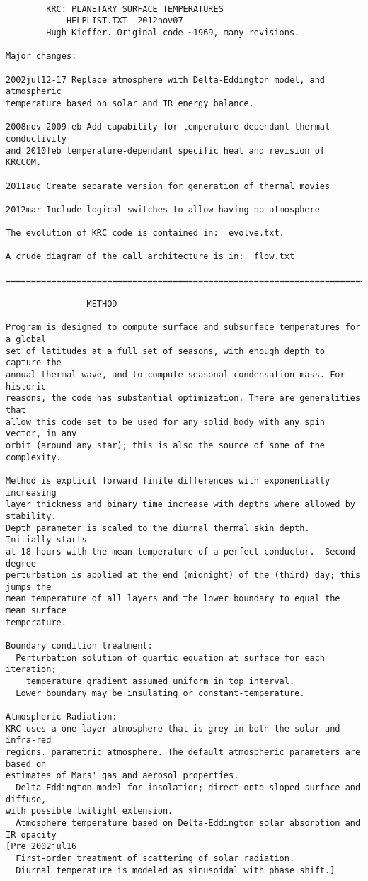 \begin{verbatim}

 		KRC: PLANETARY SURFACE TEMPERATURES
			HELPLIST.TXT  2012nov07
        Hugh Kieffer. Original code ~1969, many revisions.

Major changes:

2002jul12-17 Replace atmosphere with Delta-Eddington model, and atmospheric
temperature based on solar and IR energy balance. 

2008nov-2009feb Add capability for temperature-dependant thermal conductivity
and 2010feb temperature-dependant specific heat and revision of KRCCOM.

2011aug Create separate version for generation of thermal movies

2012mar Include logical switches to allow having no atmosphere

The evolution of KRC code is contained in:  evolve.txt.

A crude diagram of the call architecture is in:  flow.txt

================================================================================

				METHOD

Program is designed to compute surface and subsurface temperatures for a global
set of latitudes at a full set of seasons, with enough depth to capture the
annual thermal wave, and to compute seasonal condensation mass. For historic
reasons, the code has substantial optimization. There are generalities that
allow this code set to be used for any solid body with any spin vector, in any
orbit (around any star); this is also the source of some of the complexity.
 
Method is explicit forward finite differences with exponentially increasing
layer thickness and binary time increase with depths where allowed by stability.
Depth parameter is scaled to the diurnal thermal skin depth.  Initially starts
at 18 hours with the mean temperature of a perfect conductor.  Second degree
perturbation is applied at the end (midnight) of the (third) day; this jumps the
mean temperature of all layers and the lower boundary to equal the mean surface
temperature.

Boundary condition treatment:
  Perturbation solution of quartic equation at surface for each iteration;
    temperature gradient assumed uniform in top interval.
  Lower boundary may be insulating or constant-temperature.

Atmospheric Radiation:
KRC uses a one-layer atmosphere that is grey in both the solar and infra-red
regions. parametric atmosphere. The default atmospheric parameters are based on
estimates of Mars' gas and aerosol properties.
  Delta-Eddington model for insolation; direct onto sloped surface and diffuse,
with possible twilight extension.
  Atmosphere temperature based on Delta-Eddington solar absorption and IR opacity
[Pre 2002jul16
  First-order treatment of scattering of solar radiation. 
  Diurnal temperature is modeled as sinusoidal with phase shift.]


\end{verbatim}
